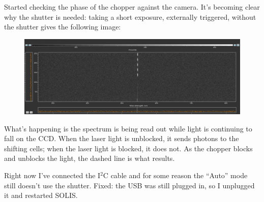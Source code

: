 \documentclass[11pt]{labbook}
\begin{document}

Started checking the phase of the chopper against the camera. It's becoming clear why the shutter is needed: taking a short exposure, externally triggered, without the shutter gives the following image:

\begin{figure}[H]
  \includegraphics[width=\linewidth]{chopped_spectrum}
\end{figure}

What's happening is the spectrum is being read out while light is continuing to fall on the CCD. When the laser light is unblocked, it sends photons to the shifting cells; when the laser light is blocked, it does not. As the chopper blocks and unblocks the light, the dashed line is what results.

Right now I've connected the I\(^2\)C cable and for some reason the ``Auto'' mode still doesn't use the shutter. Fixed: the USB was still plugged in, so I unplugged it and restarted SOLIS.
\end{document}
